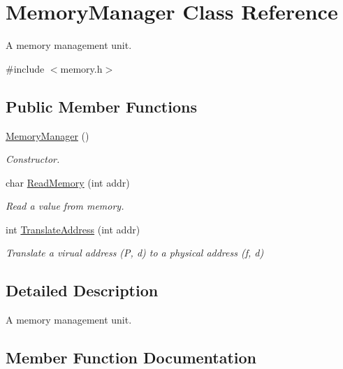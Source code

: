 \hypertarget{classMemoryManager}{}\section{Memory\+Manager Class Reference}
\label{classMemoryManager}


A memory management unit.  




{\ttfamily \#include $<$memory.\+h$>$}

\subsection*{Public Member Functions}
\begin{DoxyCompactItemize}
\item 
\hyperlink{classMemoryManager_ae925e8ad4d8fe6f0565e9d5729f59593}{Memory\+Manager} ()\hypertarget{classMemoryManager_ae925e8ad4d8fe6f0565e9d5729f59593}{}\label{classMemoryManager_ae925e8ad4d8fe6f0565e9d5729f59593}

\begin{DoxyCompactList}\small\item\em Constructor. \end{DoxyCompactList}\item 
char \hyperlink{classMemoryManager_a4a716fc46ee321ebb25bd54bcc9d0524}{Read\+Memory} (int addr)
\begin{DoxyCompactList}\small\item\em Read a value from memory. \end{DoxyCompactList}\item 
int \hyperlink{classMemoryManager_a905ceff7ad39c05c2d965af613156547}{Translate\+Address} (int addr)
\begin{DoxyCompactList}\small\item\em Translate a virual address (P, d) to a physical address (f, d) \end{DoxyCompactList}\end{DoxyCompactItemize}


\subsection{Detailed Description}
A memory management unit. 

\subsection{Member Function Documentation}
